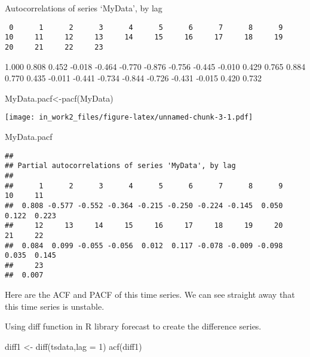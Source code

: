 \documentclass[
]{article}
\newenvironment{Shaded}{\begin{snugshade}}{\end{snugshade}}
\newcommand{\AttributeTok}[1]{\textcolor[rgb]{0.77,0.63,0.00}{#1}}
\newcommand{\DecValTok}[1]{\textcolor[rgb]{0.00,0.00,0.81}{#1}}
\newcommand{\FunctionTok}[1]{\textcolor[rgb]{0.00,0.00,0.00}{#1}}
\newcommand{\NormalTok}[1]{#1}
\newcommand{\OtherTok}[1]{\textcolor[rgb]{0.56,0.35,0.01}{#1}}
\begin{document}
Autocorrelations of series `MyData', by lag

\begin{verbatim}
 0      1      2      3      4      5      6      7      8      9     10     11     12     13     14     15     16     17     18     19     20     21     22     23 
\end{verbatim}

1.000 0.808 0.452 -0.018 -0.464 -0.770 -0.876 -0.756 -0.445 -0.010 0.429
0.765 0.884 0.770 0.435 -0.011 -0.441 -0.734 -0.844 -0.726 -0.431 -0.015
0.420 0.732

\begin{Shaded}
\begin{Highlighting}[]
\NormalTok{MyData.pacf}\OtherTok{\textless{}{-}}\FunctionTok{pacf}\NormalTok{(MyData)}
\end{Highlighting}
\end{Shaded}

\texttt{[image: in\_work2\_files/figure-latex/unnamed-chunk-3-1.pdf]}

\begin{Shaded}
\begin{Highlighting}[]
\NormalTok{MyData.pacf}
\end{Highlighting}
\end{Shaded}

\begin{verbatim}
## 
## Partial autocorrelations of series 'MyData', by lag
## 
##      1      2      3      4      5      6      7      8      9     10     11 
##  0.808 -0.577 -0.552 -0.364 -0.215 -0.250 -0.224 -0.145  0.050  0.122  0.223 
##     12     13     14     15     16     17     18     19     20     21     22 
##  0.084  0.099 -0.055 -0.056  0.012  0.117 -0.078 -0.009 -0.098  0.035  0.145 
##     23 
##  0.007
\end{verbatim}

Here are the ACF and PACF of this time series. We can see straight away
that this time series is unstable.

Using diff function in R library forecast to create the difference
series.

\begin{Shaded}
\begin{Highlighting}[]
\NormalTok{diff1 }\OtherTok{\textless{}{-}} \FunctionTok{diff}\NormalTok{(tsdata,}\AttributeTok{lag =} \DecValTok{1}\NormalTok{)}
\FunctionTok{acf}\NormalTok{(diff1)}
\end{Highlighting}
\end{Shaded}
\end{document}
